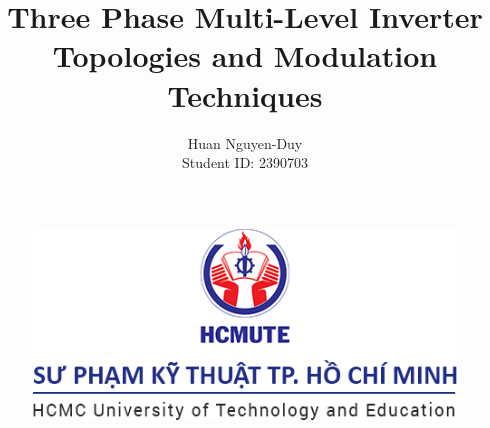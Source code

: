 \documentclass[
	11pt, %
]{beamer}
\title[Final report]{Three Phase Multi-Level Inverter Topologies and Modulation Techniques} %
\author[Huan Nguyen-Duy]{Huan Nguyen-Duy \\ Student ID: 2390703} %
\institute[HCMUTE]{Ho Chi Minh City University of Technology and Education} %
\date[Apr/08/2024]{} %
\begin{document}

\begin{frame}
    \begin{figure}
		\includegraphics[width=0.4\linewidth]{HCMUTE.png}
	\end{figure}
	\titlepage
\end{frame}


\end{document}
